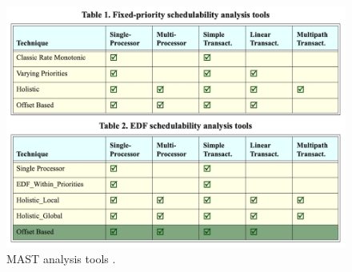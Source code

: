 \documentclass{article}
\begin{document}
\begin{figure}[!htbp]
\centering
\includegraphics[width=5in]{images/mast-analysis}
\caption{MAST analysis tools \cite{mast-analysis}.}
\label{mast-analysis-tools}
\end{figure}
\end{document}
